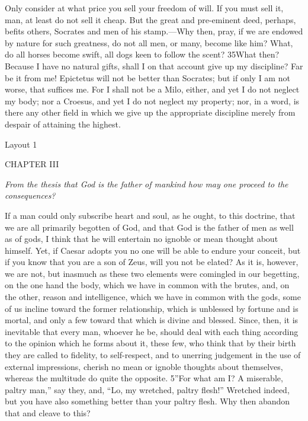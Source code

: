 Only consider at what price you sell your freedom of will. If you must sell it, man, at least do not sell it cheap. But the great and pre-eminent deed, perhaps, befits others, Socrates and men of his stamp.—Why then, pray, if we are endowed by nature for such greatness, do not all men, or many, become like him? What, do all horses become swift, all dogs keen to follow the scent? 35What then? Because I have no natural gifts, shall I on that account give up my discipline? Far be it from me! Epictetus will not be better than Socrates; but if only I am not worse, that suffices me. For I shall not be a Milo, either, and yet I do not neglect my body; nor a Croesus, and yet I do not neglect my property; nor, in a word, is there any other field in which we give up the appropriate discipline merely from despair of attaining the highest.



Layout 1

CHAPTER III

\emph{From the thesis that God is the father of mankind how may one proceed to the consequences?}

If a man could only subscribe heart and soul, as he ought, to this doctrine, that we are all primarily begotten of God, and that God is the father of men as well as of gods, I think that he will entertain no ignoble or mean thought about himself. Yet, if Caesar adopts you no one will be able to endure your conceit, but if you know that you are a son of Zeus, will you not be elated? As it is, however, we are not, but inasmuch as these two elements were comingled in our begetting, on the one hand the body, which we have in common with the brutes, and, on the other, reason and intelligence, which we have in common with the gods, some of us incline toward the former relationship, which is unblessed by fortune and is mortal, and only a few toward that which is divine and blessed. Since, then, it is inevitable that every man, whoever he be, should deal with each thing according to the opinion which he forms about it, these few, who think that by their birth they are called to fidelity, to self-respect, and to unerring judgement in the use of external impressions, cherish no mean or ignoble thoughts about themselves, whereas the multitude do quite the opposite. 5''For what am I? A miserable, paltry man,'' say they, and, ``Lo, my wretched, paltry flesh!'' Wretched indeed, but you have also something better than your paltry flesh. Why then abandon that and cleave to this?

